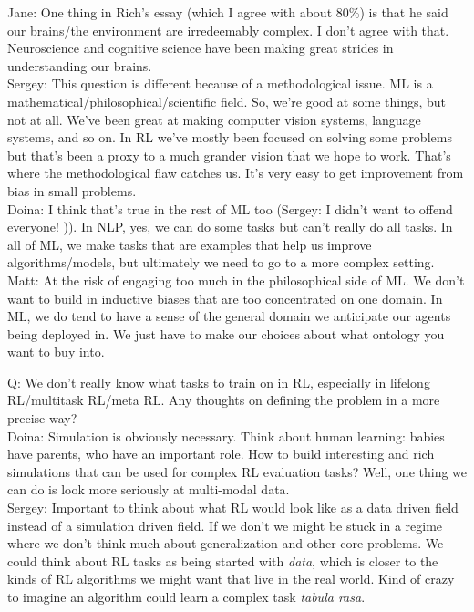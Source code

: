 Jane: One thing in Rich's essay (which I agree with about 80\%) is that he said our brains/the environment are irredeemably complex. I don't agree with that. Neuroscience and cognitive science have been making great strides in understanding our brains. \\

Sergey: This question is different because of a methodological issue. ML is a mathematical/philosophical/scientific field. So, we're good at some things, but not at all. We've been great at making computer vision systems, language systems, and so on. In RL we've mostly been focused on solving some problems but that's been a proxy to a much grander vision that we hope to work. That's where the methodological flaw catches us. It's very easy to get improvement from bias in small problems. \\

Doina: I think that's true in the rest of ML too (Sergey: I didn't want to offend everyone! )). In NLP, yes, we can do some tasks but can't really do all tasks. In all of ML, we make tasks that are examples that help us improve algorithms/models, but ultimately we need to go to a more complex setting. \\

Matt: At the risk of engaging too much in the philosophical side of ML. We don't want to build in inductive biases that are too concentrated on one domain. In ML, we do tend to have a sense of the general domain we anticipate our agents being deployed in. We just have to make our choices about what ontology you want to buy into.\\

\spacerule

Q: We don't really know what tasks to train on in RL, especially in lifelong RL/multitask RL/meta RL. Any thoughts on defining the problem in a more precise way? \\

Doina: Simulation is obviously necessary. Think about human learning: babies have parents, who have an important role. How to build interesting and rich simulations that can be used for complex RL evaluation tasks? Well, one thing we can do is look more seriously at multi-modal data. \\

Sergey: Important to think about what RL would look like as a data driven field instead of a simulation driven field. If we don't we might be stuck in a regime where we don't think much about generalization and other core problems. We could think about RL tasks as being started with {\it data}, which is closer to the kinds of RL algorithms we might want that live in the real world. Kind of crazy to imagine an algorithm could learn a complex task {\it tabula rasa}.\\

